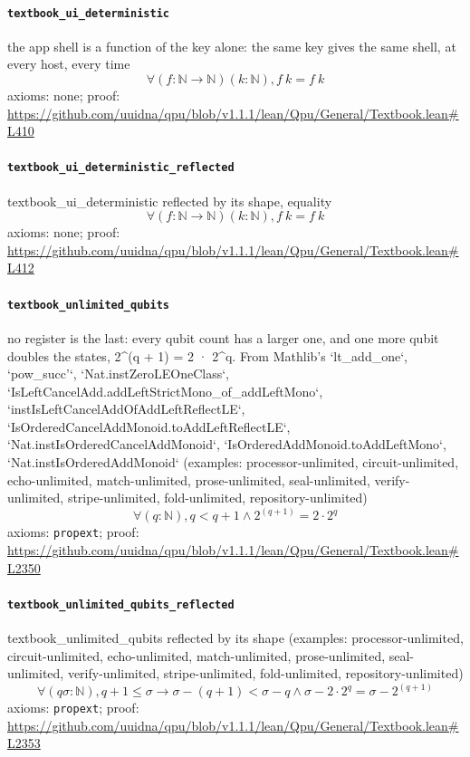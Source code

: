 \documentclass[11pt]{article}
\begin{document}
\paragraph{\texttt{textbook\_ui\_deterministic}}
the app shell is a function of the key alone: the same key gives the same shell, at every host, every time
\[ \forall (f : \mathbb{N} \to \mathbb{N}) (k : \mathbb{N}), f\ k = f\ k \]
\noindent axioms: none; proof: \url{https://github.com/uuidna/qpu/blob/v1.1.1/lean/Qpu/General/Textbook.lean\#L410}

\paragraph{\texttt{textbook\_ui\_deterministic\_reflected}}
textbook\_ui\_deterministic reflected by its shape, equality
\[ \forall (f : \mathbb{N} \to \mathbb{N}) (k : \mathbb{N}), f\ k = f\ k \]
\noindent axioms: none; proof: \url{https://github.com/uuidna/qpu/blob/v1.1.1/lean/Qpu/General/Textbook.lean\#L412}

\paragraph{\texttt{textbook\_unlimited\_qubits}}
no register is the last: every qubit count has a larger one, and one more qubit doubles the states, 2\^{}(q + 1) = 2 · 2\^{}q. From Mathlib's `lt\_add\_one`, `pow\_succ'`, `Nat.instZeroLEOneClass`, `IsLeftCancelAdd.addLeftStrictMono\_of\_addLeftMono`, `instIsLeftCancelAddOfAddLeftReflectLE`, `IsOrderedCancelAddMonoid.toAddLeftReflectLE`, `Nat.instIsOrderedCancelAddMonoid`, `IsOrderedAddMonoid.toAddLeftMono`, `Nat.instIsOrderedAddMonoid` (examples: processor-unlimited, circuit-unlimited, echo-unlimited, match-unlimited, prose-unlimited, seal-unlimited, verify-unlimited, stripe-unlimited, fold-unlimited, repository-unlimited)
\[ \forall (q : \mathbb{N}), q < q + 1 \land 2 ^{(q + 1)} = 2 \cdot 2 ^{q} \]
\noindent axioms: \texttt{propext}; proof: \url{https://github.com/uuidna/qpu/blob/v1.1.1/lean/Qpu/General/Textbook.lean\#L2350}

\paragraph{\texttt{textbook\_unlimited\_qubits\_reflected}}
textbook\_unlimited\_qubits reflected by its shape (examples: processor-unlimited, circuit-unlimited, echo-unlimited, match-unlimited, prose-unlimited, seal-unlimited, verify-unlimited, stripe-unlimited, fold-unlimited, repository-unlimited)
\[ \forall (q \sigma : \mathbb{N}), q + 1 \le \sigma \to \sigma - (q + 1) < \sigma - q \land \sigma - 2 \cdot 2 ^{q} = \sigma - 2 ^{(q + 1)} \]
\noindent axioms: \texttt{propext}; proof: \url{https://github.com/uuidna/qpu/blob/v1.1.1/lean/Qpu/General/Textbook.lean\#L2353}
\end{document}
